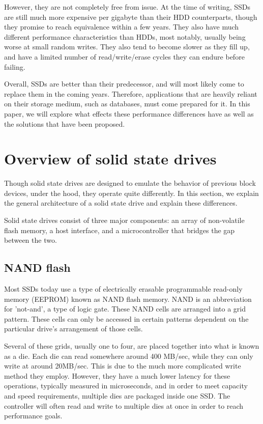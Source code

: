 \documentclass[format=acmsmall, review=false, screen=true]{acmart}
\begin{document}
However, they are not completely free from issue. At the time of writing, SSDs are still much more expensive per gigabyte 
than their HDD counterparts, though they promise to reach equivalence within a few years. They also have much different 
performance characteristics than HDDs, most notably, usually being worse at small random writes. They also tend to become 
slower as they fill up, and have a limited number of read/write/erase cycles they can endure before failing. 
\cite{Xie2011, Dumitru2007}

Overall, SSDs are better than their predecessor, and will most likely come to replace them in the coming years. Therefore, 
applications that are heavily reliant on their storage medium, such as databases, must come prepared for it. In this paper, 
we will explore what effects these performance differences have as well as the solutions that have been proposed.

\section{Overview of solid state drives}

Though solid state drives are designed to emulate the behavior of previous block devices, under the hood, they operate 
quite differently. \cite{Lee2008, Cornwell2012, Micheloni2013, MatejFucek2014} In this section, we explain the general 
architecture of a solid state drive and explain these differences.

Solid state drives consist of three major components: an array of non-volatile flash memory, a host interface, and a 
microcontroller that bridges the gap between the two. 

\subsection{NAND flash}

Most SSDs today use a type of electrically erasable programmable read-only memory (EEPROM) known as NAND flash memory. 
NAND is an abbreviation for 'not-and', a type of logic gate. These NAND cells are arranged into a grid pattern. These 
cells can only be accessed in certain patterns dependent on the particular drive's arrangement of those cells. 
\cite{Cornwell2012, Micheloni2013}

Several of these grids, usually one to four, are placed together into what is known as a die. Each die can read somewhere 
around 400 MB/sec, while they can only write at around 20MB/sec. This is due to the much more complicated write method 
they employ. However, they have a much lower latency for these operations, typically measured in microseconds, and in 
order to meet capacity and speed requirements, multiple dies are packaged inside one SSD. The controller will often 
read and write to multiple dies at once in order to reach performance goals. \cite{Cornwell2012, Micheloni2013}
\end{document}

